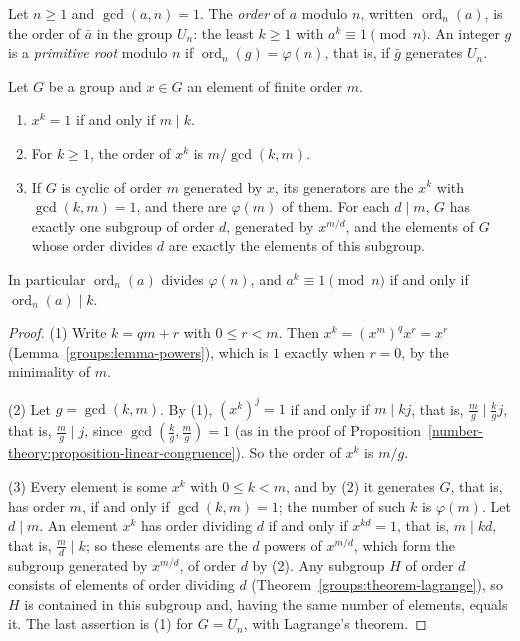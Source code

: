 \begin{definition}\label{number-theory:definition-order}
Let $n \geq 1$ and $\gcd(a, n) = 1$. The \emph{order} of $a$ modulo $n$, written $\operatorname{ord}_n(a)$, is the order of $\bar{a}$ in the group $U_n$: the least $k \geq 1$ with $a^k \equiv 1 \pmod n$.
An integer $g$ is a \emph{primitive root} modulo $n$ if $\operatorname{ord}_n(g) = \varphi(n)$, that is, if $\bar{g}$ generates $U_n$.
\end{definition}

\begin{lemma}\label{number-theory:lemma-order}
Let $G$ be a group and $x \in G$ an element of finite order $m$.
\begin{enumerate}
\item $x^k = 1$ if and only if $m \mid k$.
\item For $k \geq 1$, the order of $x^k$ is $m/\gcd(k, m)$.
\item If $G$ is cyclic of order $m$ generated by $x$, its generators are the $x^k$ with $\gcd(k, m) = 1$, and there are $\varphi(m)$ of them. For each $d \mid m$, $G$ has exactly one subgroup of order $d$,
generated by $x^{m/d}$, and the elements of $G$ whose order divides $d$ are exactly the elements of this subgroup.
\end{enumerate}
In particular $\operatorname{ord}_n(a)$ divides $\varphi(n)$, and $a^k \equiv 1 \pmod n$ if and only if $\operatorname{ord}_n(a) \mid k$.
\end{lemma}

\begin{proof}
(1) Write $k = qm + r$ with $0 \leq r < m$. Then $x^k = (x^m)^qx^r = x^r$ (Lemma~\ref{groups:lemma-powers}), which is $1$ exactly when $r = 0$, by the minimality of $m$.

(2) Let $g = \gcd(k, m)$. By (1), $(x^k)^j = 1$ if and only if $m \mid kj$, that is, $\frac{m}{g} \mid \frac{k}{g}j$, that is, $\frac{m}{g} \mid j$, since $\gcd(\frac{k}{g}, \frac{m}{g}) = 1$ (as in the proof of
Proposition~\ref{number-theory:proposition-linear-congruence}). So the order of $x^k$ is $m/g$.

(3) Every element is some $x^k$ with $0 \leq k < m$, and by (2) it generates $G$, that is, has order $m$, if and only if $\gcd(k, m) = 1$; the number of such $k$ is $\varphi(m)$. Let $d \mid m$. An element
$x^k$ has order dividing $d$ if and only if $x^{kd} = 1$, that is, $m \mid kd$, that is, $\frac{m}{d} \mid k$; so these elements are the $d$ powers of $x^{m/d}$, which form the subgroup generated by
$x^{m/d}$, of order $d$ by (2). Any subgroup $H$ of order $d$ consists of elements of order dividing $d$ (Theorem~\ref{groups:theorem-lagrange}), so $H$ is contained in this subgroup and, having the
same number of elements, equals it. The last assertion is (1) for $G = U_n$, with Lagrange's theorem.
\end{proof}

